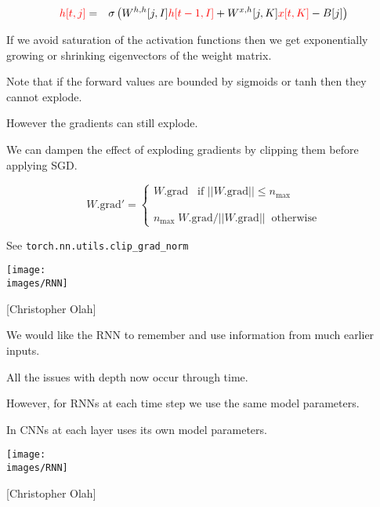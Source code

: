 {{\huge
\begin{eqnarray*}
{\color{red} h[t,j]}
& = & \sigma\left(W^{h,h}[j,I]{\color{red} h[t-1,I]} + W^{x,h}[j,K]{\color{red} x[t,K]} - B[j]\right) \\
\end{eqnarray*}
}


\vfill
If we avoid saturation of the activation functions then we get exponentially growing or shrinking eigenvectors of the weight matrix.

\vfill
Note that if the forward values are bounded by sigmoids or tanh then they cannot explode.

\vfill
However the gradients can still explode.


\vfill
We can dampen the effect of exploding gradients by clipping them before applying SGD.

\vfill
$$W.\mathrm{grad'} = \left\{\begin{array}{l} W.\mathrm{grad} \;\;\;\mbox{if $||W.\mathrm{grad}|| \leq n_{\mathrm{max}}$} \\
                                                      \\ \\
                                                      n_{\mathrm{max}} \; W.\mathrm{grad} / ||W.\mathrm{grad}|| \;\; \mbox{otherwise}
\end{array} \right.$$

\vfill
See {\tt torch.nn.utils.clip\_grad\_norm}


\centerline{\texttt{[image: \\images/RNN]}}
\centerline{{\large [Christopher Olah]}}

\vfill
We would like the RNN to {\color{red} remember and use} information from much earlier inputs.


\vfill
All the issues with depth now occur through time.

\vfill
However, for RNNs {\color{red} at each time step we use the same model parameters.}

\vfill
In CNNs {\color{red} at each layer uses its own model parameters.}


\centerline{\texttt{[image: \\images/RNN]}}
\centerline{{\large [Christopher Olah]}}

}
